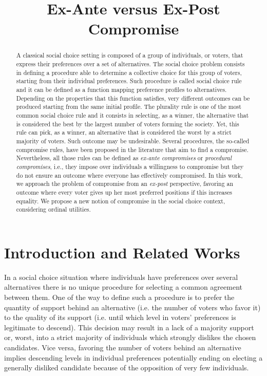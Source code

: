 \documentclass[version=3.21, pagesize, notitlepage, twoside=off, bibliography=totoc, DIV=calc, fontsize=12pt, a4paper]{scrartcl}
\title{Ex-Ante versus Ex-Post \\ Compromise}
\author{}
\date{}
\begin{document}
\maketitle
\thispagestyle{empty}

\begin{abstract}
	A classical social choice setting is composed of a group of individuals, or voters, that express their preferences over a set of alternatives. The social choice problem consists in defining a procedure able to determine a collective choice for this group of voters, starting from their individual preferences. Such procedure is called social choice rule and it can be defined as a function mapping preference profiles to alternatives. Depending on the properties that this function satisfies, very different outcomes can be produced starting from the same initial profile. The plurality rule is one of the most common social choice rule and it consists in selecting, as a winner, the alternative that is considered the best by the largest number of voters forming the society. Yet, this rule can pick, as a winner, an alternative that is considered the worst by a strict majority of voters. Such outcome may be undesirable. Several procedures, the so-called compromise rules, have been proposed in the literature that aim to find a compromise. Nevertheless, all those rules can be defined as \textit{ex-ante compromises} or \textit{procedural compromises}, i.e., they impose over individuals a willingness to compromise but they do not ensure an outcome where everyone has effectively compromised. In this work, we approach the problem of compromise from an \textit{ex-post} perspective, favoring an outcome where every voter gives up her most preferred positions if this increases equality. We propose a new notion of compromise in the social choice context, considering ordinal utilities. 
\end{abstract}

\pagebreak

\section{Introduction and Related Works}

In a social choice situation where individuals have preferences over several alternatives there is no unique procedure for selecting a common agreement between them. One of the way to define such a procedure is to prefer the quantity of support behind an alternative (i.e. the number of voters who favor it) to the quality of its support (i.e. until which level in voters’ preferences is legitimate to descend). This decision may result in a lack of a majority support or, worst, into a strict majority of individuals which strongly dislikes the chosen candidates. Vice versa, favoring the number of voters behind an alternative implies descending levels in individual preferences potentially ending on electing a generally disliked candidate because of the opposition of very few individuals. 
\end{document}
